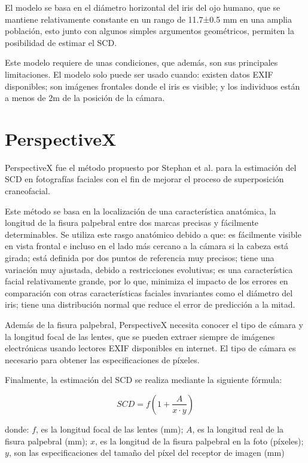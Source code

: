 El modelo se basa en el diámetro horizontal del iris del ojo humano, que se mantiene relativamente constante en un rango de 11.7±0.5 mm en una amplia población, esto junto con algunos simples argumentos geométricos, permiten la posibilidad de estimar el SCD.

Este modelo requiere de unas condiciones, que además, son sus principales limitaciones. El modelo solo puede ser usado cuando: existen datos EXIF disponibles; son imágenes frontales donde el iris es visible; y los individuos están a menos de 2m de la posición de la cámara.



\section{PerspectiveX}

PerspectiveX fue el método propuesto por Stephan et al. \cite{21} para la estimación del SCD en fotografías faciales con el fin de mejorar el proceso de superposición craneofacial.

Este método se basa en la localización de una característica anatómica, la longitud de la fisura palpebral entre dos marcas precisas y fácilmente determinables. Se utiliza este rasgo anatómico debido a que: es fácilmente visible en vista frontal e incluso en el lado más cercano a la cámara si la cabeza está girada; está definida por dos puntos de referencia muy precisos; tiene una variación muy ajustada, debido a restricciones evolutivas; es una característica facial relativamente grande, por lo que, minimiza el impacto de los errores en comparación con otras características faciales invariantes como el diámetro del iris; tiene una distribución normal que reduce el error de predicción a la mitad.

Además de la fisura palpebral, PerspectiveX necesita conocer el tipo de cámara y la longitud focal de las lentes, que se pueden extraer siempre de imágenes electrónicas usando lectores EXIF disponibles en internet. El tipo de cámara es necesario para obtener las especificaciones de píxeles.

Finalmente, la estimación del SCD se realiza mediante la siguiente fórmula:

\begin{equation}
	SCD = f (1+\frac{A}{x \cdot y})
\end{equation}

donde: $f$, es la longitud focal de las lentes (mm); $A$, es la longitud real de la fisura palpebral (mm); $x$, es la longitud de la fisura palpebral en la foto (píxeles); $y$, son las especificaciones del tamaño del píxel del receptor de imagen (mm)

